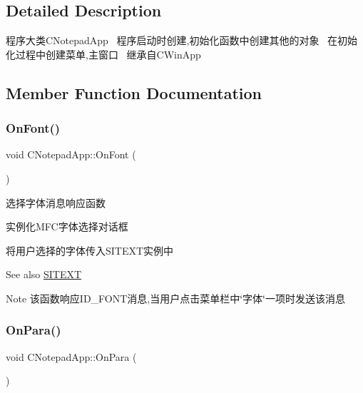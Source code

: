 \subsection{Detailed Description}
程序大类\+C\+Notepad\+App~\newline
程序启动时创建,初始化函数中创建其他的对象~\newline
在初始化过程中创建菜单,主窗口~\newline
继承自\+C\+Win\+App 

\subsection{Member Function Documentation}
\mbox{\label{class_c_notepad_app_aa09334de95a65c56cdca8a682b006bb6}} 
\subsubsection{\texorpdfstring{On\+Font()}{OnFont()}}
{\footnotesize\ttfamily void C\+Notepad\+App\+::\+On\+Font (\begin{DoxyParamCaption}{ }\end{DoxyParamCaption})}



选择字体消息响应函数~\newline



\begin{DoxyItemize}
\item 实例化\+M\+F\+C字体选择对话框
\item 将用户选择的字体传入\+S\+I\+T\+E\+X\+T实例中 \begin{DoxySeeAlso}{See also}
\hyperlink{class_s_i_t_e_x_t}{S\+I\+T\+E\+XT} 
\end{DoxySeeAlso}
\begin{DoxyNote}{Note}
该函数响应\+I\+D\+\_\+\+F\+O\+N\+T消息,当用户点击菜单栏中\char`\"{}字体\char`\"{}一项时发送该消息 
\end{DoxyNote}

\end{DoxyItemize}\mbox{\label{class_c_notepad_app_a954649ecbb87fb8a001f2ed399440261}} 
\subsubsection{\texorpdfstring{On\+Para()}{OnPara()}}
{\footnotesize\ttfamily void C\+Notepad\+App\+::\+On\+Para (\begin{DoxyParamCaption}{ }\end{DoxyParamCaption})}



